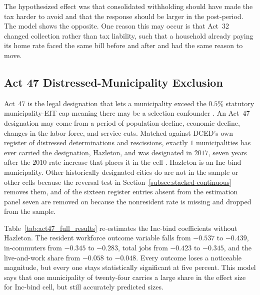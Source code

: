 \documentclass[12pt]{article}
\begin{document}
The hypothesized effect was that consolidated withholding should have made the tax harder
to avoid and that the response should be larger in the post-period. The model shows the opposite. One reason this may occur is that Act~32 changed collection rather than tax liability, such that a household already paying its home rate faced the same bill before and
after and had the same reason to move.





\subsection{Act 47 Distressed-Municipality Exclusion}
\label{subsec:rob-act47}

Act~47 is the legal designation that
lets a municipality exceed the $0.5\%$ statutory municipality-EIT
cap meaning there may be a selection confounder \citep{paAct47_1987}. An
Act~47 designation may come from a period of population
decline, economic decline, changes in the labor force, and service cuts. Matched against DCED's own register of
distressed determinations and rescissions, exactly $1$ municipalities has ever carried the designation, Hazleton, and was designated in $2017$, seven years after the $2010$ rate
increase that places it in the cell \citep{Act47Financial}. Hazleton is an Inc-bind municipality.  Other
historically designated cities do are not in the sample or other cells because the
reversal test in Section~\ref{subsec:stacked-continuous} removes them, and
of the sixteen register entries absent from the estimation panel seven are
removed on because the nonresident rate is missing and dropped from the sample. 

Table~\ref{tab:act47_full_results} re-estimates the Inc-bind coefficients
without Hazleton. The resident workforce outcome variable falls from $-0.537$ to $-0.439$,
in-commuters from $-0.345$ to $-0.283$, total jobs from $-0.423$ to
$-0.345$, and the live-and-work share from $-0.058$ to $-0.048$. Every
outcome loses a noticeable magnitude, but every one stays
statistically significant at five percent. This model says that one
municipality of twenty-four carries a large share in the effect size for Inc-bind cell, but still accurately predicted sizes.


\end{document}
